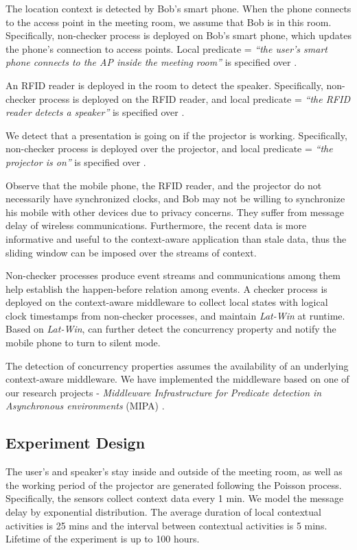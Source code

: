 \documentclass[12pt,journal,letterpaper,compsoc]{IEEEtran}
\begin{document}
The location context is detected by Bob's smart phone. When the phone connects to the access point in the meeting room, we assume that Bob is in this room. Specifically, non-checker process  is deployed on Bob's smart phone, which updates the phone's connection to access points. Local predicate  = {\it``the user's smart phone connects to the AP inside the meeting room''} is specified over .

An RFID reader is deployed in the room to detect the speaker. Specifically, non-checker process  is deployed on the RFID reader, and local predicate  = {\it``the RFID reader detects a speaker''} is specified over .

We detect that a presentation is going on if the projector is working. Specifically, non-checker process  is deployed over the projector, and local predicate  = {\it``the projector is on''} is specified over .

Observe that the mobile phone, the RFID reader, and the projector do not necessarily have synchronized clocks, and Bob may not be willing to synchronize his mobile with other devices due to privacy concerns. They suffer from message delay of wireless communications. Furthermore, the recent data is more informative and useful to the context-aware application than stale data, thus the sliding window can be imposed over the streams of context.

Non-checker processes produce event streams and communications among them help establish the happen-before relation among events. A checker process  is deployed on the context-aware middleware to collect local states with logical clock timestamps from non-checker processes, and maintain {\it Lat-Win} at runtime. Based on {\it Lat-Win},  can further detect the concurrency property  \cite{Huang11} and notify the mobile phone to turn to silent mode.

The detection of concurrency properties assumes the availability of an underlying context-aware middleware. We have implemented the middleware based on one of our research projects - {\it Middleware Infrastructure for Predicate detection in Asynchronous environments} (MIPA) \cite{MIPA, Huang10b, Huang11}.

\subsection{Experiment Design}

The user's and speaker's stay inside and outside of the meeting room, as well as the working period of the projector are generated following the Poisson process. Specifically, the sensors collect context data every 1 min. We model the message delay by exponential distribution. The average duration of local contextual activities is 25 mins and the interval between contextual activities is 5 mins. Lifetime of the experiment is up to 100 hours.
\end{document}
